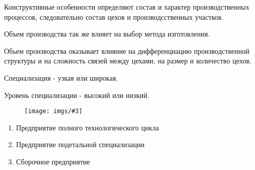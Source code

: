 \documentclass[14pt,a4paper,oneside]{extarticle}
\newcommand{\pic}[3]{
	\begin{figure}[#1]
		\begin{center}
			\texttt{[image: imgs/\#3]}
		\end{center}
	\end{figure}
}
\begin{document}
Конструктивные особенности определяют состав и характер производственных процессов, следовательно состав цехов и производсственных участков.

Объем производства так же влияет на выбор метода изготовления.

Обьем производства оказывает влияние на дифференциацию производственной структуры и на сложность связей между цехами, на размер и количество цехов.

Специализация - узкая или широкая.

Уровень специализации - высокий или низкий.

\pic{H}{\textwidth/2}{9}

\begin{enumerate}
    \item Предприятие полного технологического цикла 
    \item Предприятие подетальной специализации
    \item Сборочное предприятие
\end{enumerate}
\end{document}
